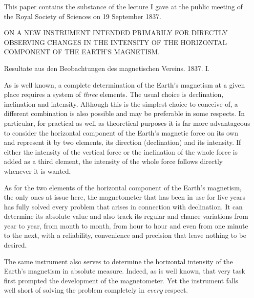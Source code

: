 \expandafter\def\csname HistoricalNoteText363\endcsname{This paper contains the substance of the lecture I gave at the public meeting of the Royal Society of Sciences on 19 September 1837.}
\clearpage
{}
\begin{center}
{\large ON A NEW INSTRUMENT INTENDED PRIMARILY FOR DIRECTLY OBSERVING CHANGES IN THE INTENSITY OF THE HORIZONTAL COMPONENT OF THE EARTH’S MAGNETISM.}
\par\medskip
Resultate aus den Beobachtungen des magnetischen Vereins. 1837. I.
\end{center}

As is well known, a complete determination of the Earth’s magnetism at a given place requires a system of \textit{three} elements. The usual choice is declination, inclination and intensity. Although this is the simplest choice to conceive of, a different combination is also possible and may be preferable in some respects. In particular, for practical as well as theoretical purposes it is far more advantageous to consider the horizontal component of the Earth’s magnetic force on its own and represent it by two elements, its direction (declination) and its intensity. If either the intensity of the vertical force or the inclination of the whole force is added as a third element, the intensity of the whole force follows directly whenever it is wanted.

As for the two elements of the horizontal component of the Earth’s magnetism, the only ones at issue here, the magnetometer that has been in use for five years has fully solved every problem that arises in connection with declination. It can determine its absolute value and also track its regular and chance variations from year to year, from month to month, from hour to hour and even from one minute to the next, with a reliability, convenience and precision that leave nothing to be desired.

The same instrument also serves to determine the horizontal intensity of the Earth’s magnetism in absolute measure. Indeed, as is well known, that very task first prompted the development of the magnetometer. Yet the instrument falls well short of solving the problem completely in \textit{every} respect.


